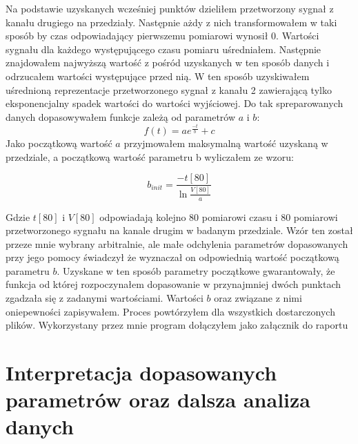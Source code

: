 \documentclass[10pt,a4paper]{article}
\begin{document}
Na podstawie uzyskanych wcześniej punktów dzieliłem przetworzony sygnał z kanału drugiego na przedziały. Następnie ażdy z nich transformowałem w taki sposób by czas odpowiadający pierwszemu pomiarowi wynosił 0. Wartości sygnału dla każdego występującego czasu pomiaru uśredniałem. Następnie znajdowałem najwyższą wartość z pośród uzyskanych w ten sposób danych i odrzucałem wartości występujące przed nią.  W ten sposób uzyskiwałem uśrednioną  reprezentacje przetworzonego sygnał z kanału 2 zawierającą tylko eksponencjalny spadek wartości do wartości wyjściowej. Do tak spreparowanych danych dopasowywałem funkcje zależą od parametrów $a$ i $b$: 
\begin{equation}
    \label{exp}
    f(t) = a e^{\frac{-t}{b}} + c
\end{equation}
Jako początkową wartość $a$ przyjmowałem maksymalną wartość uzyskaną w przedziale, a początkową wartość parametru b wyliczałem ze wzoru:

\begin{equation}
    \label{binit}
    b_{init} = \frac{-t[80]}{\ln{\frac{V[80]}{a}}}
\end{equation}

Gdzie $t[80]$ i $V[80]$ odpowiadają kolejno 80 pomiarowi czasu i 80 pomiarowi przetworzonego sygnału na kanale drugim w badanym przedziale.  Wzór ten został przeze mnie wybrany arbitralnie, ale małe odchylenia parametrów dopasowanych przy jego pomocy świadczył że wyznaczał on odpowiednią wartość początkową parametru $b$. Uzyskane w ten sposób parametry początkowe gwarantowały, że funkcja od której rozpoczynałem dopasowanie w przynajmniej dwóch punktach zgadzała się z zadanymi wartościami.
Wartości $b$ oraz związane z nimi oniepewności zapisywałem. Proces powtórzyłem dla wszystkich dostarczonych plików.
Wykorzystany przez mnie program dołączyłem jako załącznik do raportu

\section{Interpretacja dopasowanych parametrów oraz dalsza analiza danych}
\end{document}
